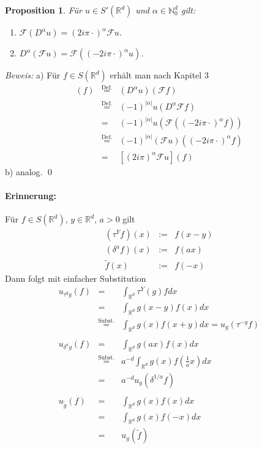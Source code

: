 \documentclass[12pt]{extreport} %
\newtheorem{Prop}[Satz]{Proposition}
\numberwithin{equation}{section}
\newcommand{\R}{\mathbb{R}} %
\newcommand{\N}{\mathbb{N}} %
\newcommand{\F}{\mathcal{F}}
\newcommand{\m}{\cdot}
\newcommand{\Bew}{\emph{Beweis: }}
\begin{document}
	\begin{Prop}
		Für $u\in S'(\R^d)$ und $\alpha\in \N_0^d$ gilt:
		\begin{enumerate}
			\item[a)] $\F(D^\alpha u) = (2i\pi \m)^\alpha \F u$.
			\item[b)] $D^\alpha (\F u) = \F((-2i\pi \m)^\alpha u)$.
		\end{enumerate}
	\end{Prop}
	\Bew a) Für $f\in S(\R^d)$ erhält man nach Kapitel 3
	\begin{eqnarray}
		[\F(D^\alpha u)](f)&\overset{\text{Def.}}{=}& (D^\alpha u)(\F f)\nonumber\\
		&\overset{\text{Def.}}{=} & (-1)^{|\alpha|} u(D^\alpha \F f)\nonumber\\
		&=& (-1)^{|\alpha|} u (\F((-2i\pi\m)^\alpha f)) \nonumber\\
		&\overset{\text{Def.}}{=}& (-1)^{|\alpha|}(\F u)((-2i\pi\m)^\alpha f)\nonumber\\
		&=& [(2i\pi)^\alpha \F u](f)\nonumber
	\end{eqnarray}
	b) analog.
	\qed
	
	\paragraph{Erinnerung:} Für $f\in S(\R^d)$, $y\in \R^d$, $a>0$ gilt
	\begin{eqnarray}
		(\tau^Y f)(x) &:=& f(x-y)\nonumber\\
		(\delta^a f)(x)&:=& f(ax)\nonumber\\
		\tilde{f}(x) &:= & f(-x)\nonumber
	\end{eqnarray}
	Dann folgt mit einfacher Substitution
	\begin{eqnarray}
		u_{\tau^y g}(f) &=& \int_{\R^d} \tau^Y(g)f dx \nonumber\\
		&=& \int_{\R^d}g(x-y) f(x) dx \nonumber\\
		&\overset{\text{Subst.}}{=}& \int_{\R^d} g(x)f(x+y)dx = u_g(\tau^{-y}f)\nonumber\\\nonumber \\
		u_{\delta^a g}(f) &=& \int_{\R^d}g(ax)f(x)dx \nonumber\\
		&\overset{\text{Subst.}}{=}& a^{-d}\int_{\R^d} g(x)f(\frac{1}{a}x)dx \nonumber\\
		&=& a^{-d}u_g(\delta^{1/a}f)\nonumber\\\nonumber\\
		u_{\tilde{g}}(f) &=& \int_{\R^d}g(x)f(x)dx \nonumber\\
		&=& \int_{\R^d}g(x)f(-x) dx\nonumber\\
		&=& u_g(\tilde{f})\nonumber
	\end{eqnarray}
	
\end{document}
